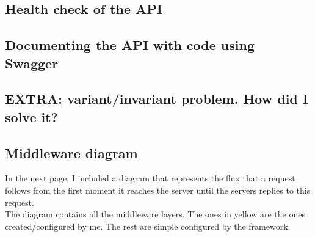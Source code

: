     \subsection{Health check of the API}
    \subsection{Documenting the API with code using Swagger}
    \subsection{EXTRA: variant/invariant problem. How did I solve it?}
    \subsection{Middleware diagram}
    In the next page, I included a diagram that represents the flux that a request follows from the first moment it reaches the server until the servers replies to this request. \\

    The diagram contains all the middleware layers. The ones in yellow are the ones created/configured by me. The rest are simple configured by the framework. \\

